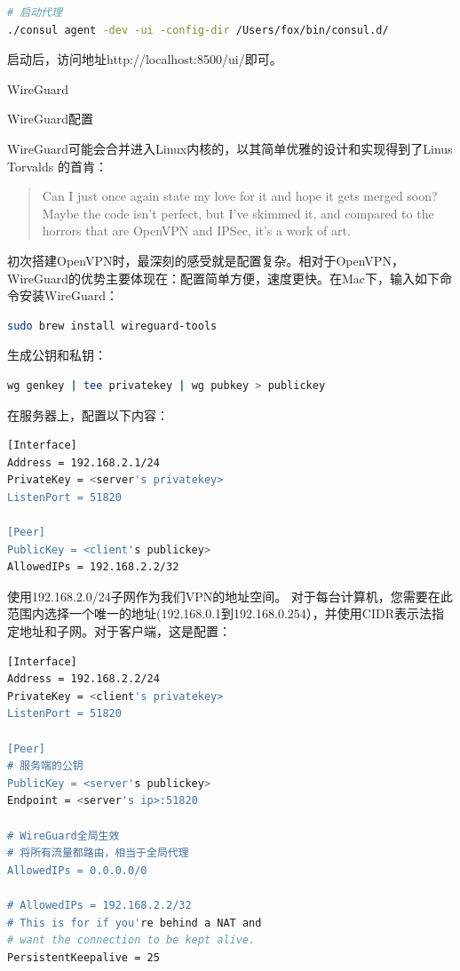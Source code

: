 \documentclass[8pt]{book}
\makeatletter
\numberwithin{dummy}{section}
\theoremstyle{ocrenumbox}
\theoremstyle{blacknumex}
\theoremstyle{blacknumbox}
\theoremstyle{ocrenum}
\renewcommand{\section}{\@startsection{section}{1}{\z@}
	{-4ex \@plus -1ex \@minus -.4ex}
	{1ex \@plus.2ex }
	{\normalfont\large\sffamily\bfseries}}
\renewcommand{\subsection}{\@startsection {subsection}{2}{\z@}
	{-3ex \@plus -0.1ex \@minus -.4ex}
	{0.5ex \@plus.2ex }
	{\normalfont\sffamily\bfseries}}
\makeatother
\begin{document}
\begin{lstlisting}[language=Bash]
# 启动代理
./consul agent -dev -ui -config-dir /Users/fox/bin/consul.d/
\end{lstlisting}


启动后，访问地址http://localhost:8500/ui/即可。

\section{WireGuard}

\subsection{WireGuard配置}

WireGuard可能会合并进入Linux内核的，以其简单优雅的设计和实现得到了Linus Torvalds 的首肯：

\begin{quote}
Can I just once again state my love for it and hope it gets merged soon? Maybe the code isn’t perfect, but I’ve skimmed it, and compared to the horrors that are OpenVPN and IPSec, it’s a work of art.
\end{quote}


初次搭建OpenVPN时，最深刻的感受就是配置复杂。相对于OpenVPN，WireGuard的优势主要体现在：配置简单方便，速度更快。在Mac下，输入如下命令安装WireGuard：

\begin{lstlisting}[language=Bash]
sudo brew install wireguard-tools
\end{lstlisting}


生成公钥和私钥：

\begin{lstlisting}[language=Bash]
wg genkey | tee privatekey | wg pubkey > publickey
\end{lstlisting}

在服务器上，配置以下内容：

\begin{lstlisting}[language=Bash]
[Interface]　　
Address = 192.168.2.1/24　　
PrivateKey = <server's privatekey>　　
ListenPort = 51820　　

[Peer]　　
PublicKey = <client's publickey>　　
AllowedIPs = 192.168.2.2/32
\end{lstlisting}

使用192.168.2.0/24子网作为我们VPN的地址空间。 对于每台计算机，您需要在此范围内选择一个唯一的地址(192.168.0.1到192.168.0.254），并使用CIDR表示法指定地址和子网。对于客户端，这是配置：
\begin{lstlisting}[language=Bash]
[Interface]　　
Address = 192.168.2.2/24　　
PrivateKey = <client's privatekey>　　
ListenPort = 51820
　　
[Peer]
# 服务端的公钥　　
PublicKey = <server's publickey>　　
Endpoint = <server's ip>:51820　　

# WireGuard全局生效
# 将所有流量都路由，相当于全局代理
AllowedIPs = 0.0.0.0/0

# AllowedIPs = 192.168.2.2/32　　
# This is for if you're behind a NAT and　　
# want the connection to be kept alive.　　
PersistentKeepalive = 25
\end{lstlisting}
\end{document}
